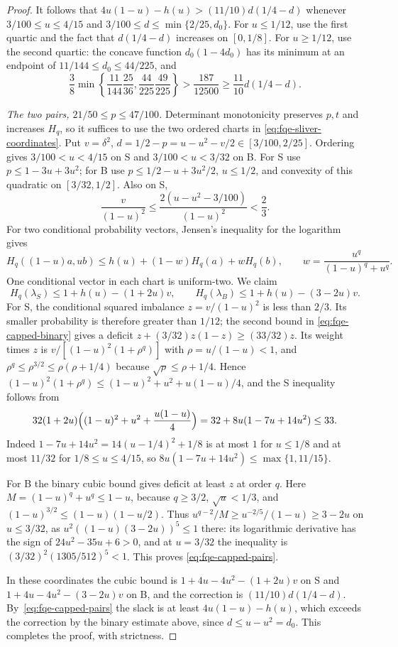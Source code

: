 \begin{proof}
It follows that $4u(1-u)-h(u)>(11/10)d(1/4-d)$ whenever
$3/100\le u\le4/15$ and $3/100\le d\le\min\{2/25,d_0\}$.
For $u\le1/12$, use the first quartic and the fact that
$d(1/4-d)$ increases on $[0,1/8]$.
For $u\ge1/12$, use the second quartic: the concave function $d_0(1-4d_0)$
has its minimum at an endpoint of $11/144\le d_0\le44/225$, and
\[
\frac38\min\left\{\frac{11}{144}\frac{25}{36},
\frac{44}{225}\frac{49}{225}\right\}
>\frac{187}{12500}
\ge\frac{11}{10}d(1/4-d).
\]

\emph{The two pairs, $21/50\le p\le47/100$.}
Determinant monotonicity preserves $p,t$ and increases $H_q$, so it suffices
to use the two ordered charts in \eqref{eq:fqe-sliver-coordinates}.
Put $v=\delta^2$, $d=1/2-p=u-u^2-v/2\in[3/100,2/25]$.
Ordering gives $3/100<u<4/15$ on S and $3/100<u<3/32$ on B.
For S use $p\le1-3u+3u^2$; for B use
$p\le1/2-u+3u^2/2$, $u\le1/2$, and convexity of this quadratic on
$[3/32,1/2]$. Also on S,
\[
\frac{v}{(1-u)^2}\le\frac{2(u-u^2-3/100)}{(1-u)^2}<\frac23.
\]
For two conditional probability vectors, Jensen's inequality for the logarithm gives
\[
H_q((1-u)a,ub)\le h(u)+(1-w)H_q(a)+wH_q(b),\qquad
w=\frac{u^q}{(1-u)^q+u^q}.
\]
One conditional vector in each chart is uniform-two. We claim
\[
H_q(\lambda_S)\le1+h(u)-(1+2u)v,\qquad
H_q(\lambda_B)\le1+h(u)-(3-2u)v.
\tag{CG3}\label{eq:fqe-capped-pairs}
\]
For S, the conditional squared imbalance $z=v/(1-u)^2$ is less than $2/3$.
Its smaller probability is therefore greater than $1/12$; the second bound in
\eqref{eq:fqe-capped-binary} gives a deficit
$z+(3/32)z(1-z)\ge(33/32)z$.
Its weight times $z$ is $v/[(1-u)^2(1+\rho^q)]$ with $\rho=u/(1-u)<1$, and
$\rho^q\le\rho^{3/2}\le\rho(\rho+1/4)$ because $\sqrt\rho\le\rho+1/4$. Hence
$(1-u)^2(1+\rho^q)\le(1-u)^2+u^2+u(1-u)/4$, and the S inequality follows from
\[
 32(1+2u)\Bigl((1-u)^2+u^2+\frac{u(1-u)}4\Bigr)=32+8u(1-7u+14u^2)\le33 .
\]
Indeed $1-7u+14u^2=14(u-1/4)^2+1/8$ is at most $1$ for $u\le1/8$ and at most $11/32$ for
$1/8\le u\le4/15$, so $8u(1-7u+14u^2)\le\max\{1,11/15\}$.

For B the binary cubic bound gives deficit at least $z$ at order $q$.
Here $M=(1-u)^q+u^q\le1-u$, because $q\ge3/2$, $\sqrt u<1/3$, and
$(1-u)^{3/2}\le(1-u)(1-u/2)$.
Thus $u^{q-2}/M\ge u^{-2/5}/(1-u)\ge3-2u$ on $u\le3/32$, as $u^2((1-u)(3-2u))^5\le1$ there:
its logarithmic derivative has the sign of $24u^2-35u+6>0$, and at $u=3/32$ the inequality is
$(3/32)^2(1305/512)^5<1$.
This proves \eqref{eq:fqe-capped-pairs}.

In these coordinates the cubic bound is
$1+4u-4u^2-(1+2u)v$ on S and
$1+4u-4u^2-(3-2u)v$ on B, and the correction is $(11/10)d(1/4-d)$.
By~\eqref{eq:fqe-capped-pairs} the slack is at least $4u(1-u)-h(u)$, which exceeds the correction
by the binary estimate above, since $d\le u-u^2=d_0$. This completes the proof, with strictness.
\end{proof}

